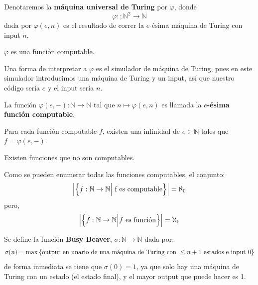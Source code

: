 \documentclass[12pt]{report}
\theoremstyle{largebreak}
\newcommand\abs[1]{\ensuremath{\left|#1\right|}}
\newcommand\cf[3]{\ensuremath{#1:#2\rightarrow#3}}
\begin{document}
    \begin{mydef}
        Denotaremos la \textbf{máquina universal de Turing} por $\varphi$, donde
        \begin{equation*}
            \cf{\varphi}{;\mathbb{N}^2}{\mathbb{N}}
        \end{equation*}
        dada por $\varphi(e,n)$ es el resultado de correr la $e$-ésima máquina de Turing con input $n$.
    \end{mydef}

    \begin{obs}
        $\varphi$ es una función computable.
    \end{obs}

    Una forma de interpretar a $\varphi$ es el simulador de máquina de Turing, pues en este simulador introducimos una máquina de Turing y un input, así que nuestro código sería $e$ y el input sería $n$.
    
    \begin{mydef}
        La función $\cf{\varphi(e,-)}{\mathbb{N}}{\mathbb{N}}$ tal que $n\mapsto\varphi(e,n)$ es llamada la \textbf{$e$-ésima función computable}.
    \end{mydef}

    \begin{theor}
        Para cada función computable $f$, existen una infinidad de $e\in\mathbb{N}$ tales que $f=\varphi(e,-)$.
    \end{theor}

    Existen funciones que no son computables.

    \begin{obs}
        Como se pueden enumerar todas las funciones computables, el conjunto:
        \begin{equation*}
            \abs{\left\{\cf{f}{\mathbb{N}}{\mathbb{N}}\Big|\textup{ f es computable}\right\}}=\aleph_0
        \end{equation*}
        pero,
        \begin{equation*}
            \abs{\left\{\cf{f}{\mathbb{N}}{\mathbb{N}}\Big|f\textup{ es función} \right\}}=\aleph_1
        \end{equation*}
    \end{obs}

    \begin{exa}
        Se define la función \textbf{Busy Beaver}, $\cf{\sigma}{\mathbb{N}}{\mathbb{N}}$ dada por:
        \begin{equation*}
            \sigma(n)=\max\left\{\textup{output en unario de una máquina de Turing con }\leq n+1\textup{ estados e input }0 \right\}
        \end{equation*}
        de forma inmediata se tiene que $\sigma(0)=1$, ya que solo hay una máquina de Turing con un estado (el estado final), y el mayor output que puede hacer es 1.
    \end{exa}
\end{document}
